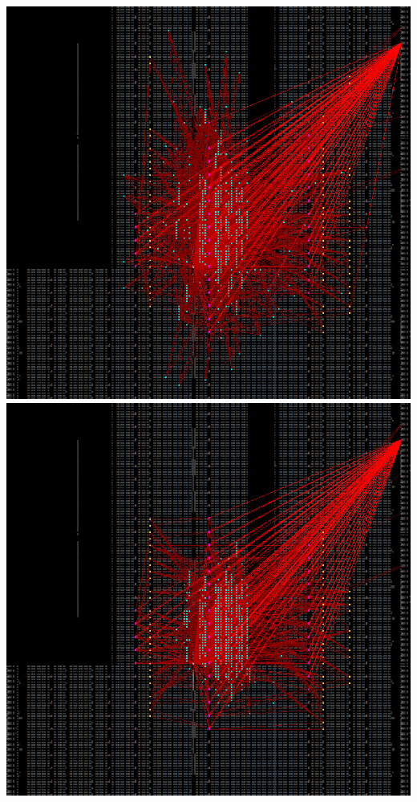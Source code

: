 {    \includegraphics[valign=t, scale=0.13]{figures/results/PlacerAnnealRandom/00000100.png}
    \includegraphics[valign=t, scale=0.13]{figures/results/PlacerAnnealRandom/00000299.png}
    \label{fig:PARSnapshots}
}

